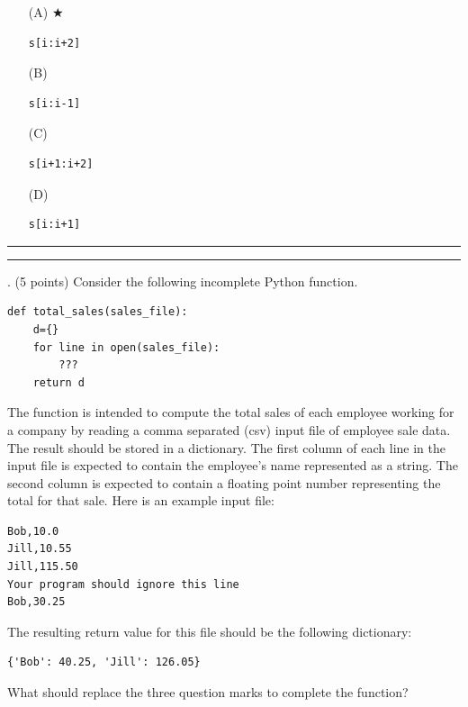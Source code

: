 \documentclass{article}
\newcounter{question}
\begin{document}
\begin{enumerate}
\item[(A)] $\bigstar$ 
\begin{verbatim}s[i:i+2]\end{verbatim}

\item[(B)]
\begin{verbatim}s[i:i-1]\end{verbatim}

\item[(C)]
\begin{verbatim}s[i+1:i+2]\end{verbatim}

\item[(D)]
\begin{verbatim}s[i:i+1]\end{verbatim}

\end{enumerate}

\vspace*{2em}
\hrule
\vspace{2em}

\vspace{2em}
\hrule height 2pt


\newpage
{}. (5 points)
Consider the following incomplete Python function.
\begin{verbatim}
def total_sales(sales_file):
    d={}
    for line in open(sales_file):
        ???
    return d
\end{verbatim}
The function is intended to compute the total sales of each employee working for a company by reading a comma separated (csv) input file of employee sale data. The result should be stored in a dictionary. The first column of each line in the input file is expected to contain the employee's name represented as a string. The second column is expected to contain a floating point number representing the total for that sale. Here is an example input file:
\begin{verbatim}
Bob,10.0
Jill,10.55
Jill,115.50
Your program should ignore this line
Bob,30.25
\end{verbatim}
The resulting return value for this file should be the following dictionary:
\begin{verbatim}
{'Bob': 40.25, 'Jill': 126.05}
\end{verbatim}
What should replace the three question marks to complete the function?
\end{document}

